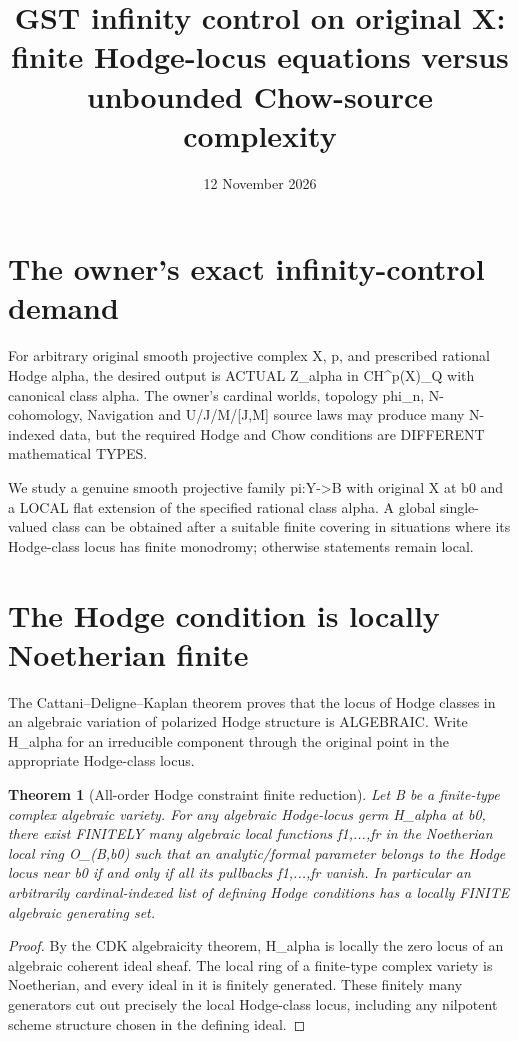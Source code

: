 \documentclass[11pt]{article}
\title{GST infinity control on original X: finite Hodge-locus equations versus unbounded Chow-source complexity}
\date{12 November 2026}
\newtheorem{theorem}{Theorem}
\begin{document}
\maketitle

\section{The owner's exact infinity-control demand}
For arbitrary original smooth projective complex X, p,
and prescribed rational Hodge alpha, the desired output is
ACTUAL Z_alpha in CH^p(X)_Q with canonical class alpha.
The owner's cardinal worlds, topology phi_n, N-cohomology,
Navigation and U/J/M/[J,M] source laws may produce many
N-indexed data, but the required Hodge and Chow conditions
are DIFFERENT mathematical TYPES.

We study a genuine smooth projective family pi:Y->B
with original X at b0 and a LOCAL flat extension
of the specified rational class alpha.
A global single-valued class can be obtained after a suitable
finite covering in situations where its Hodge-class locus
has finite monodromy; otherwise statements remain local.

\section{The Hodge condition is locally Noetherian finite}
The Cattani--Deligne--Kaplan theorem proves that the
locus of Hodge classes in an algebraic variation of
polarized Hodge structure is ALGEBRAIC.
Write H_alpha for an irreducible component through
the original point in the appropriate Hodge-class locus.

\begin{theorem}[All-order Hodge constraint finite reduction]
Let B be a finite-type complex algebraic variety.
For any algebraic Hodge-locus germ H_alpha at b0,
there exist FINITELY many algebraic local functions
f1,...,fr in the Noetherian local ring
O_(B,b0) such that an analytic/formal parameter
belongs to the Hodge locus near b0 if and only if
all its pullbacks f1,...,fr vanish.
In particular an arbitrarily cardinal-indexed list
of defining Hodge conditions has a locally FINITE
algebraic generating set.
\end{theorem}
\begin{proof}
By the CDK algebraicity theorem, H_alpha is locally
the zero locus of an algebraic coherent ideal sheaf.
The local ring of a finite-type complex variety is
Noetherian, and every ideal in it is finitely generated.
These finitely many generators cut out precisely the
local Hodge-class locus, including any nilpotent
scheme structure chosen in the defining ideal.
\end{proof}
\end{document}
